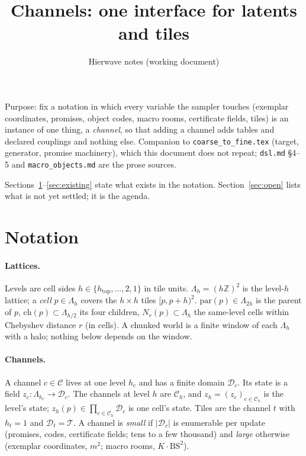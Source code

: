 \documentclass[11pt]{article}
\title{Channels: one interface for latents and tiles}
\author{Hierwave notes (working document)}
\date{}
\newcommand{\Z}{\mathbb{Z}}
\newcommand{\1}{\mathds{1}}
\newcommand{\Dom}{\mathcal{D}}
\newcommand{\Chan}{\mathcal{C}}
\begin{document}
\sloppy
\maketitle

\noindent Purpose: fix a notation in which every variable the sampler touches
(exemplar coordinates, promises, object codes, macro rooms, certificate fields,
tiles) is an instance of one thing, a \emph{channel}, so that adding a channel
adds tables and declared couplings and nothing else. Companion to
\texttt{coarse\_to\_fine.tex} (target, generator, promise machinery), which this
document does not repeat; \texttt{dsl.md} \S4--5 and \texttt{macro\_objects.md}
are the prose sources.

Sections~\ref{sec:notation}--\ref{sec:existing} state what exists in the
notation. Section~\ref{sec:open} lists what is not yet settled; it is the agenda.

\section{Notation}
\label{sec:notation}

\paragraph{Lattices.} Levels are cell sides $h \in \{h_{\text{top}}, \dots, 2, 1\}$
in tile units. $\Lambda_h = (h\Z)^2$ is the level-$h$ lattice; a \emph{cell}
$p \in \Lambda_h$ covers the $h \times h$ tiles $[p, p + h)^2$. $\mathrm{par}(p)
\in \Lambda_{2h}$ is the parent of $p$, $\mathrm{ch}(p) \subset \Lambda_{h/2}$ its
four children, $N_r(p) \subset \Lambda_h$ the same-level cells within Chebyshev
distance $r$ (in cells). A chunked world is a finite window of each $\Lambda_h$
with a halo; nothing below depends on the window.

\paragraph{Channels.} A channel $c \in \Chan$ lives at one level $h_c$ and has a
finite domain $\Dom_c$. Its state is a field $z_c : \Lambda_{h_c} \to \Dom_c$.
The channels at level $h$ are $\Chan_h$, and $z_h = (z_c)_{c \in \Chan_h}$ is the
level's state; $z_h(p) \in \prod_{c \in \Chan_h} \Dom_c$ is one cell's state. Tiles
are the channel $t$ with $h_t = 1$ and $\Dom_t = \mathcal T$. A channel is
\emph{small} if $|\Dom_c|$ is enumerable per update (promises, codes, certificate
fields; tens to a few thousand) and \emph{large} otherwise (exemplar coordinates,
$m^2$; macro rooms, $K \cdot \mathrm{BS}^2$).
\end{document}
